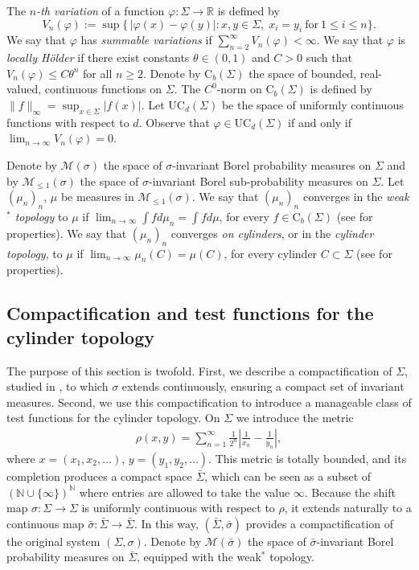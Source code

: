 \documentclass[letterpaper,11pt]{amsart}
\numberwithin{equation}{section}     %
\newcommand{\M}{\mathcal{M}}
\newcommand{\R}{\mathbb{R}}
\def\phi{\varphi}
\def\R{{\mathbb R}}
\def\M{{\mathcal M}}
\def\le{\leqslant}
\def\M{\mathcal{M}}
\begin{document}
The \emph{$n$-th variation} of a function $\phi:\Sigma \to \R$ is defined by  
$$V_{n}(\phi):= \sup \{\,| \phi(x)-  \phi(y)| : x,y \in \Sigma,\; x_{i}=y_{i}\ \text{for}\ 1 \leq i \leq n \}.$$
We say that $\phi$ has \emph{summable variations} if $\sum_{n=2}^{\infty} V_n(\phi)< \infty$. We say that $\phi$ is \emph{locally H\"older} if there exist constants $\theta \in (0,1)$ and $C>0$ such that $V_{n}(\phi) \leq C \theta^{n}$ for all $n \geq 2$.  Denote by $\text{C}_b(\Sigma)$  the space of bounded, real-valued, continuous functions on $\Sigma$. The $C^0$-norm on $\text{C}_b(\Sigma)$ is defined by  $\|f\|_\infty=\sup_{x\in\Sigma}|f(x)|$. Let $\mathrm{UC}_d(\Sigma)$ be the space of uniformly continuous functions with respect to $d$. Observe that $\phi\in \mathrm{UC}_d(\Sigma)$ if and only if $\lim_{n\to\infty}V_n(\phi)=0$. 

Denote by $\M(\sigma)$ the space of $\sigma$-invariant Borel probability measures on $\Sigma$ and by $\M_{\le1}(\sigma)$ the space of $\sigma$-invariant Borel sub-probability measures on $\Sigma$. Let $(\mu_n)_n$, $\mu$ be measures in $\M_{\le1}(\sigma)$.  We say that $(\mu_n)_n$ converges in the \emph{weak$^\ast$ topology} to $\mu$ if $\lim_{n\to\infty}\int f d\mu_n=\int fd\mu$, for every $f\in \text{C}_b(\Sigma)$ (see \cite{par} for properties).  We say that $(\mu_n)_n$ converges \emph{on cylinders}, or in the \emph{cylinder topology}, to $\mu$ if $\lim_{n\to\infty}\mu_n(C)= \mu(C)$, for every cylinder $C\subset\Sigma$ (see \cite{iv} for properties). 




\subsection{Compactification and test functions for the cylinder topology}\label{sec:test} 

The purpose of this section is twofold. First, we describe a compactification of $\Sigma$, studied in \cite{gs,it,iv2,z}, to which $\sigma$ extends continuously, ensuring a compact set of invariant measures. Second, we use this compactification to introduce a manageable class of test functions for the cylinder topology. On $\Sigma$ we introduce the metric 
\begin{align}
\label{eq:metric}\rho(x,y)=\sum_{n=1}^\infty \frac{1}{2^n}\left|\frac{1}{x_n}-\frac{1}{y_n}\right|,
\end{align}
where $x=(x_1,x_2,\ldots)$, $y=(y_1,y_2, \ldots)$.  This metric is totally bounded, and its completion produces a compact space 
$\bar\Sigma$, which can be seen as a subset of $(\mathbb{N}\cup\{\infty\})^\mathbb{N}$ 
where entries are allowed to take the value $\infty$. Because the shift map 
$\sigma:\Sigma\to\Sigma$ is uniformly continuous with respect to $\rho$, it 
extends naturally to a continuous map $\bar\sigma:\bar\Sigma\to\bar\Sigma$. In this 
way, $(\bar\Sigma,\bar\sigma)$ provides a compactification of the original system 
$(\Sigma,\sigma)$. Denote by $\M(\bar\sigma)$ the space of $\bar\sigma$-invariant Borel probability measures on $\bar\Sigma$, equipped with the weak$^\ast$ topology.
\end{document}
